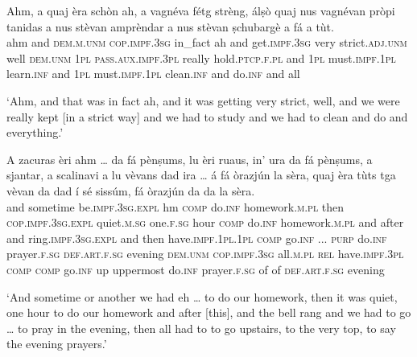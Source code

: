 \begin{linenumbers}
\gll    Ahm, a quaj èra schòn ah, a vagnéva fétg strèng, álṣò quaj nus vagnévan pròpi tanidas a nus stèvan amprèndar a nus stèvan ṣchubargè a fá a tùt.\\
ahm and \textsc{dem.m.unm} \textsc{cop.impf.3sg} in\_fact ah and get.\textsc{impf.3sg} very strict.\textsc{adj.unm} well \textsc{dem.unm} \textsc{1pl} \textsc{pass.aux.impf.3pl} really hold.\textsc{ptcp.f.pl} and \textsc{1pl} must.\textsc{impf.1pl} learn.\textsc{inf} and \textsc{1pl}  must.\textsc{impf.1pl} clean.\textsc{inf} and do.\textsc{inf} and all\\
\end{linenumbers}
\medskip
\glt `Ahm, and that was in fact ah, and it was getting very strict, well, and we were really kept [in a strict way] and we had to study and we had to clean and do and everything.'
\medskip

\begin{linenumbers}
\gll A zacuras èri ahm …  da fá pènṣums, lu èri ruaus, in’ ura da  fá  pènṣums, a  sjantar, a scalinavi a  lu vèvans  dad   ira  …  á  fá  òrazjún la sèra, quaj èra tùts tga vèvan da dad í sé sissúm, fá  òrazjún   da da la sèra.\\
 and sometime be.\textsc{impf.3sg.expl} hm {} \textsc{comp} do.\textsc{inf} homework.\textsc{m.pl} then \textsc{cop.impf.3sg.expl} quiet.\textsc{m.sg} one.\textsc{f.sg} hour \textsc{comp} do.\textsc{inf} homework.\textsc{m.pl} and after and   ring.\textsc{impf.3sg.expl} and then have.\textsc{impf.1pl.1pl} \textsc{comp} go.\textsc{inf} ... \textsc{purp} do.\textsc{inf} prayer.\textsc{f.sg} \textsc{def.art.f.sg} evening \textsc{dem.unm} \textsc{cop.impf.3sg} all.\textsc{m.pl} \textsc{rel} have.\textsc{impf.3pl} \textsc{comp} \textsc{comp} go.\textsc{inf} up uppermost do.\textsc{inf} prayer.\textsc{f.sg} of of \textsc{def.art.f.sg} evening \\
\end{linenumbers}
\medskip
\glt `And sometime or another we had eh … to do our homework, then it was quiet, one hour to do our homework and after [this], and the bell rang and we had to go … to pray in the evening, then all had to to go upstairs, to the very top, to say the evening prayers.'
\medskip

